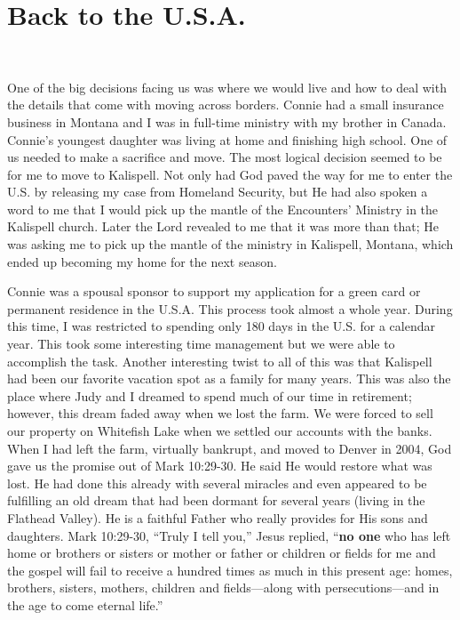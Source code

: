 \documentclass[twoside, 12pt]{book}
\begin{document}
\section{Back to the U.S.A.}
\

One of the big decisions facing us was where we would live and how to deal with the details that come with moving across borders. Connie had a small insurance business in Montana and I was in full-time ministry with my brother in Canada. Connie’s youngest daughter was living at home and finishing high school. One of us needed to make a sacrifice and move. The most logical decision seemed to be for me to move to Kalispell. Not only had God paved the way for me to enter the U.S. by releasing my case from Homeland Security, but He had also spoken a word to me that I would pick up the mantle of the Encounters’ Ministry in the Kalispell church. Later the Lord revealed to me that it was more than that; He was asking me to pick up the mantle of the ministry in Kalispell, Montana, which ended up becoming my home for the next season.

Connie was a spousal sponsor to support my application for a green card or permanent residence in the U.S.A. This process took almost a whole year. During this time, I was restricted to spending only 180 days in the U.S. for a calendar year. This took some interesting time management but we were able to accomplish the task. Another interesting twist to all of this was that Kalispell had been our favorite vacation spot as a family for many years. This was also the place where Judy and I dreamed to spend much of our time in retirement; however, this dream faded away when we lost the farm. We were forced to sell our property on Whitefish Lake when we settled our accounts with the banks. When I had left the farm, virtually bankrupt, and moved to Denver in 2004, God gave us the promise out of Mark 10:29-30. He said He would restore what was lost. He had done this already with several miracles and even appeared to be fulfilling an old dream that had been dormant for several years (living in the Flathead Valley). He is a faithful Father who really provides for His sons and daughters. Mark 10:29-30, “Truly I tell you,” Jesus replied, ``\textbf{no one} who has left home or brothers or sisters or mother or father or children or fields for me and the gospel will fail to receive a hundred times as much in this present age: homes, brothers, sisters, mothers, children and fields—along with persecutions—and in the age to come eternal life.”
\end{document}
